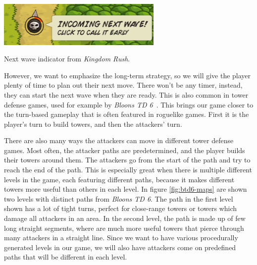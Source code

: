 \begin{center}
    \captionsetup{type=figure}
    \includegraphics[width=0.6\textwidth]{img/Kingdom-Rush-Next-Wave-Detail.png}
    \caption{Next wave indicator from \emph{Kingdom Rush}.}
    \label{fig:kr-next-wave}
\end{center}

However, we want to emphasize the long-term strategy, so we will give the player plenty of time to plan out their next move.
There won't be any timer, instead, they can start the next wave when they are ready.
This is also common in tower defense games, used for example by \emph{Bloons TD 6}~\cite{BTD6}.
This brings our game closer to the turn-based gameplay that is often featured in roguelike games.
First it is the player's turn to build towers, and then the attackers' turn.

There are also many ways the attackers can move in different tower defense games.
Most often, the attacker paths are predetermined, and the player builds their towers around them.
The attackers go from the start of the path and try to reach the end of the path.
This is especially great when there is multiple different levels in the game, each featuring different paths, because it makes different towers more useful than others in each level.
In figure \ref{fig:btd6-maps} are shown two levels with distinct paths from \emph{Bloons TD 6}.
The path in the first level shown has a lot of tight turns, perfect for close-range towers or towers which damage all attackers in an area.
In the second level, the path is made up of few long straight segments, where are much more useful towers that pierce through many attackers in a straight line.
Since we want to have various procedurally generated levels in our game, we will also have attackers come on predefined paths that will be different in each level.

